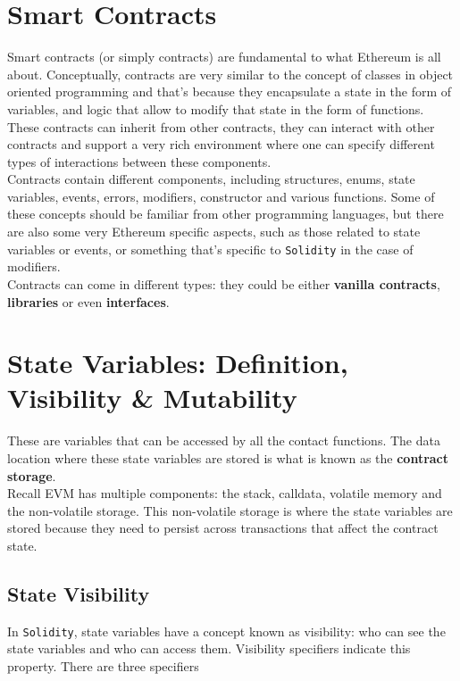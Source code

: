 \section{Smart Contracts}

Smart contracts (or simply contracts) are fundamental to what Ethereum is all about.
Conceptually, contracts are very similar to the concept of classes in object oriented programming and that's because they encapsulate a state in the form of variables, and logic that allow to modify that state in the form of functions.
These contracts can inherit from other contracts, they can interact with other contracts and support a very rich environment where one can specify different types of interactions between these components.\\

Contracts contain different components, including structures, enums, state variables, events, errors, modifiers, constructor and various functions.
Some of these concepts should be familiar from other programming languages, but there are also some very Ethereum specific aspects, such as those related to state variables or events, or something that's specific to \texttt{Solidity} in the case of modifiers.\\

Contracts can come in different types: they could be either \textbf{vanilla contracts}, \textbf{libraries} or even \textbf{interfaces}.

\section{State Variables: Definition, Visibility \& Mutability}

These are variables that can be accessed by all the contact functions.
The data location where these state variables are stored is what is known as the \textbf{contract storage}.\\

Recall EVM has multiple components: the stack, calldata, volatile memory and the non-volatile storage.
This non-volatile storage is where the state variables are stored because they need to persist across transactions that affect the contract state.

\subsection*{State Visibility}

In \texttt{Solidity}, state variables have a concept known as visibility: who can see the state variables and who can access them.
Visibility specifiers indicate this property.
There are three specifiers

